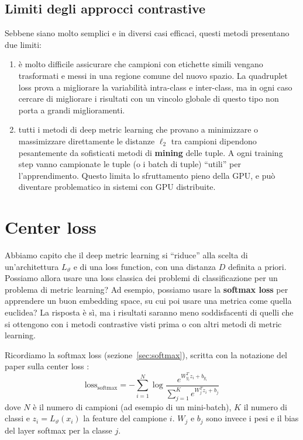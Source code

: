 \subsection{Limiti degli approcci contrastive}
Sebbene siano molto semplici e in diversi casi efficaci, questi metodi presentano due limiti:
\begin{enumerate}
    \item è molto difficile assicurare che campioni con etichette simili vengano trasformati e messi in una regione comune del nuovo spazio. La quadruplet loss prova a migliorare la variabilità intra-class e inter-class, ma in ogni caso cercare di migliorare i risultati con un vincolo globale di questo tipo non porta a grandi miglioramenti.
    \item tutti i metodi di deep metric learning che provano a minimizzare o massimizzare direttamente le distanze $\ell_2$ tra campioni dipendono pesantemente da sofisticati metodi di \textbf{mining} delle tuple. A ogni training step vanno campionate le tuple (o i batch di tuple) ``utili'' per l'apprendimento. Questo limita lo sfruttamento pieno della GPU, e può diventare problematico in sistemi con GPU distribuite.
\end{enumerate}

\section{Center loss}
Abbiamo capito che il deep metric learning si ``riduce'' alla scelta di un'architettura $L_\vartheta$ e di una loss function, con una distanza $D$ definita a priori. Possiamo allora usare una loss classica dei problemi di classificazione per un problema di metric learning? Ad esempio, possiamo usare la \textbf{softmax loss} per apprendere un buon embedding space, su cui poi usare una metrica come quella euclidea? La risposta è sì, ma i risultati saranno meno soddisfacenti di quelli che si ottengono con i metodi contrastive visti prima o con altri metodi di metric learning.

Ricordiamo la softmax loss (sezione~\ref{sec:softmax}), scritta con la notazione del paper sulla center loss \cite{Wen2016}:
\[
\mathrm{loss}_{\mathrm{softmax}} = -\sum_{i=1}^{N} \log \frac{e^{W_{y_i}^T z_i + b_{y_i}}}{\sum_{j=1}^{K} e^{W_j^T z_i + b_j}}
\]
dove $N$ è il numero di campioni (ad esempio di un mini-batch), $K$ il numero di classi e $z_i = L_\vartheta(x_i)$ la feature del campione $i$. $W_j$ e $b_j$ sono invece i pesi e il bias del layer softmax per la classe $j$.

